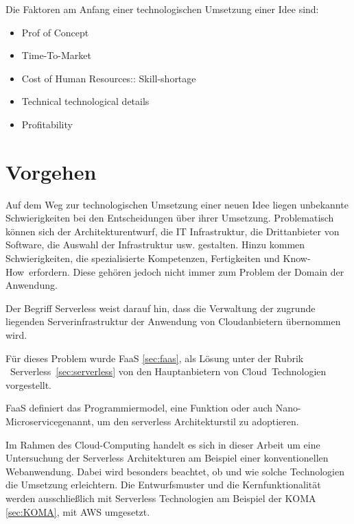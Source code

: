 \documentclass[
12pt,
english,
ngerman,
headsepline,
twoside,
openright,
numbers=noenddot,version=first
]{scrreprt}
\begin{document}

Die Faktoren am Anfang einer technologischen Umsetzung einer Idee sind:
\begin{itemize}
\item Prof of Concept\label{aspect:proofConcept}
\item Time-To-Market\label{aspect:timeToMarket}
\item Cost of Human Resources:: Skill-shortage\label{aspect:CostHumanResources}
\item Technical technological details\label{aspect:techDetails}
\item Profitability\label{aspect:profit}
\end{itemize}


\section{Vorgehen}
Auf dem Weg zur technologischen Umsetzung einer neuen Idee liegen unbekannte Schwierigkeiten
bei den Entscheidungen über ihrer Umsetzung. Problematisch können sich der Architekturentwurf, die IT Infrastruktur, die Drittanbieter von Software, die Auswahl der Infrastruktur usw. gestalten. Hinzu kommen Schwierigkeiten, die spezialisierte Kompetenzen, Fertigkeiten und \glqq Know-How\grqq\ erfordern. Diese gehören jedoch nicht immer zum Problem der Domain der Anwendung.

Der Begriff Serverless weist darauf hin, dass die Verwaltung der zugrunde liegenden Serverinfrastruktur der Anwendung von Cloudanbietern übernommen wird. 

Für dieses Problem wurde \acrfull{FaaS} \ref{sec:faas}, als Lösung unter der Rubrik \glqq\ Serverless\grqq\ \ref{sec:serverless} von den Hauptanbietern von \glqq Cloud\grqq\ Technologien vorgestellt.

\acrshort{FaaS} definiert das Programmiermodel, eine Funktion oder auch \glqq Nano-Microservice\grqq genannt, um den serverless Architekturstil zu adoptieren.


Im Rahmen des Cloud-Computing handelt es sich in dieser Arbeit um eine Untersuchung der Serverless Architekturen am Beispiel einer konventionellen Webanwendung. Dabei wird besonders beachtet, ob und wie solche Technologien die Umsetzung erleichtern. Die Entwurfsmuster und die Kernfunktionalität werden ausschließlich mit Serverless Technologien am Beispiel der \acrfull{KOMA} \ref{sec:KOMA}, mit AWS umgesetzt.
\end{document}

